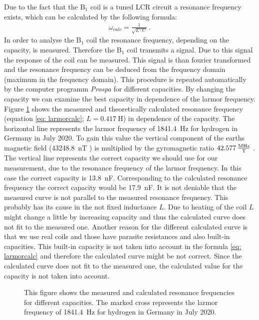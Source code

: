 Due to the fact that the B$_1$ coil is a tuned LCR circuit a resonance frequency exists, which can be calculated by the following formula:
\begin{align}
    \omega_{calc} = \frac{1}{\sqrt{L \cdot C}} \ .
    \label{eq: larmorcalc}
\end{align}
In order to analyse the B$_1$ coil the resonance frequency, depending on the capacity, is measured.
Therefore the B$_1$ coil transmits a signal.
Due to this signal the response of the coil can be measured.
This signal is than fourier transformed and the resonance frequency can be deduced from the frequency domain (maximum in the frequency domain).
This procedure is repeated automatically by the computer programm \textit{Prospa} for different capacities.
By changing the capacity we can examine the best capacity in dependence of the larmor frequency.
Figure \ref{fig: Coilanalyse} shows the measured and theoretically calculated resonance frequency (equation \eqref{eq: larmorcalc}; $L = \SI{0.417}{\henry}$) in dependence of the capacity.
The horizontal line represents the larmor frequency of \SI{1841.4}{\hertz} for hydrogen in Germany in July 2020.
To gain this value the vertical component of the earths magnetic field (\SI{43248.8}{\nano \tesla} \cite{magnetfeld}) is multiplied by the gyromagnetic ratio $\SI{42.577}{\frac{\mega \hertz}{\tesla}}$ \cite{magnetfeld}.
The vertical line represents the correct capacity we should use for our measurement, due to the resonance frequency of the larmor frequency.
In this case the correct capacity is \SI{13.8}{\nano \farad}.
Corresponding to the calculated resonance frequency the correct capacity would be \SI{17.9}{\nano \farad}.
It is not deniable that the measured curve is not parallel to the measured resonance frequency.
This probably has its cause in the not fixed inductance $L$.
Due to heating of the coil $L$ might change a little by increasing capacity and thus the calculated curve does not fit to the measured one.
Another reason for the different calculated curve is that we use real coils and those have parasite resistances and also built-in capacities.
This built-in capacity is not taken into account in the formula \eqref{eq: larmorcalc} and therefore the calculated curve might be not correct.
Since the calculated curve does not fit to the measured one, the calculated value for the capacity is not taken into account.

\begin{figure}[H]
    \centering
    
    \caption[This figure shows the measured and calculated resonance frequencies for different capacities.]{This figure shows the measured and calculated resonance frequencies for different capacities.
    The marked cross represents the larmor frequency of \SI{1841.4}{\hertz} for hydrogen in Germany in July 2020.}
    \label{fig: Coilanalyse}
\end{figure}